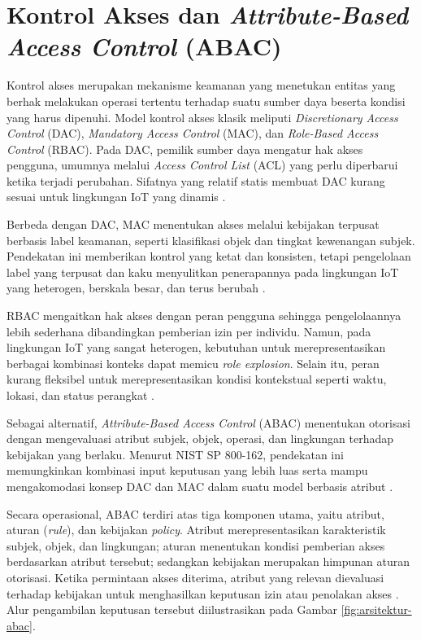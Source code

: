 \section{Kontrol Akses dan \textit{Attribute-Based Access Control} (ABAC)}

Kontrol akses merupakan mekanisme keamanan yang menetukan entitas yang berhak melakukan operasi tertentu terhadap suatu sumber daya beserta kondisi yang harus dipenuhi.
Model kontrol akses klasik meliputi \textit{Discretionary Access Control} (DAC), \textit{Mandatory Access Control} (MAC)\label{first:mac}, dan \textit{Role-Based Access Control} (RBAC).
Pada DAC, pemilik sumber daya mengatur hak akses pengguna, umumnya melalui \textit{Access Control List} (ACL)\label{first:acl} yang perlu diperbarui ketika terjadi perubahan.
Sifatnya yang relatif statis membuat DAC kurang sesuai untuk lingkungan IoT yang dinamis \parencite{ragothaman_access_2023,ahsan_comprehensive_2025}.

Berbeda dengan DAC, MAC menentukan akses melalui kebijakan terpusat berbasis label keamanan, seperti klasifikasi objek dan tingkat kewenangan subjek.
Pendekatan ini memberikan kontrol yang ketat dan konsisten, tetapi pengelolaan label yang terpusat dan kaku menyulitkan penerapannya pada lingkungan IoT yang heterogen, berskala besar, dan terus berubah \parencite{ragothaman_access_2023}.

RBAC mengaitkan hak akses dengan peran pengguna sehingga pengelolaannya lebih sederhana dibandingkan pemberian izin per individu.
Namun, pada lingkungan IoT yang sangat heterogen, kebutuhan untuk merepresentasikan berbagai kombinasi konteks dapat memicu \textit{role explosion}.
Selain itu, peran kurang fleksibel untuk merepresentasikan kondisi kontekstual seperti waktu, lokasi, dan status perangkat \parencite{ahsan_comprehensive_2025}.

Sebagai alternatif, \textit{Attribute-Based Access Control} (ABAC) menentukan otorisasi dengan mengevaluasi atribut subjek, objek, operasi, dan lingkungan terhadap kebijakan yang berlaku.
Menurut NIST\label{first:nist} SP 800-162, pendekatan ini memungkinkan kombinasi input keputusan yang lebih luas serta mampu mengakomodasi konsep DAC dan MAC dalam suatu model berbasis atribut \parencite{hu_guide_2014}.

Secara operasional, ABAC terdiri atas tiga komponen utama, yaitu atribut, aturan (\textit{rule}), dan kebijakan \textit{policy}.
Atribut merepresentasikan karakteristik subjek, objek, dan lingkungan; aturan menentukan kondisi pemberian akses berdasarkan atribut tersebut; sedangkan kebijakan merupakan himpunan aturan otorisasi.
Ketika permintaan akses diterima, atribut yang relevan dievaluasi terhadap kebijakan untuk menghasilkan keputusan izin atau penolakan akses \parencite{diaz-rodriguez_abac_2025}.
Alur pengambilan keputusan tersebut diilustrasikan pada Gambar \ref{fig:arsitektur-abac}.

